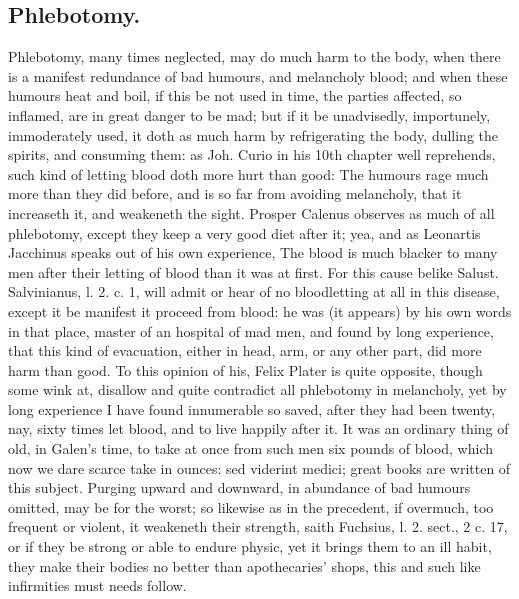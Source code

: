 {\subsection{Phlebotomy.}
Phlebotomy, many times neglected, may do much harm to
the body, when there is a manifest redundance of bad humours, and
melancholy blood; and when these humours heat and boil, if this be not
used in time, the parties affected, so inflamed, are in great danger to
be mad; but if it be unadvisedly, importunely, immoderately used, it
doth as much harm by refrigerating the body, dulling the spirits, and
consuming them: as Joh. Curio in his 10th chapter well
reprehends, such kind of letting blood doth more hurt than good:
The humours rage much more than they did before, and is so far
from avoiding melancholy, that it increaseth it, and weakeneth the
sight. Prosper Calenus observes as much of all phlebotomy, except
they keep a very good diet after it; yea, and as Leonartis
Jacchinus speaks out of his own experience, The blood is much
blacker to many men after their letting of blood than it was at first.
For this cause belike Salust. Salvinianus, l. 2. c. 1, will admit or
hear of no bloodletting at all in this disease, except it be manifest
it proceed from blood: he was (it appears) by his own words in that
place, master of an hospital of mad men, and found by long
experience, that this kind of evacuation, either in head, arm, or any
other part, did more harm than good. To this opinion of his,
Felix Plater is quite opposite, though some wink at, disallow and
quite contradict all phlebotomy in melancholy, yet by long experience I
have found innumerable so saved, after they had been twenty, nay, sixty
times let blood, and to live happily after it. It was an ordinary thing
of old, in Galen's time, to take at once from such men six pounds of
blood, which now we dare scarce take in ounces: sed viderint medici;
great books are written of this subject.
Purging upward and downward, in abundance of bad humours omitted, may
be for the worst; so likewise as in the precedent, if overmuch, too
frequent or violent, it weakeneth their strength, saith Fuchsius,
l. 2. sect., 2 c. 17, or if they be strong or able to endure physic,
yet it brings them to an ill habit, they make their bodies no better
than apothecaries' shops, this and such like infirmities must needs
follow.

}
